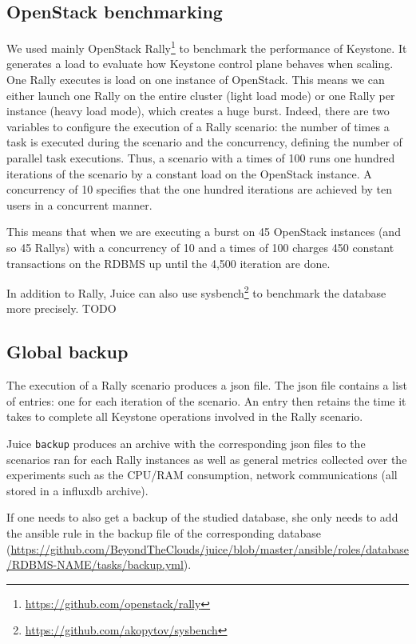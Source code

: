 \subsection{OpenStack benchmarking}
\label{subsec:benchmarking}

We used mainly OpenStack Rally\footnote{\url{https://github.com/openstack/rally}} to benchmark the performance of Keystone. It generates a load to evaluate how Keystone control plane behaves when scaling.
One Rally executes is load on one instance of OpenStack. This means we can either launch one Rally on the entire cluster (light load mode) or one Rally per instance (heavy load mode), which creates a huge burst. Indeed, there are two variables to configure the execution of a Rally scenario: the number of times a task is executed during the scenario and the concurrency, defining the number of parallel task executions. Thus, a scenario with a times of 100 runs one hundred iterations of the scenario by a constant load on the OpenStack instance. A concurrency of 10 specifies that the one hundred iterations are achieved by ten users in a concurrent manner.

This means that when we are executing a burst on 45 OpenStack instances (and so 45 Rallys) with a concurrency of 10 and a times of 100 charges 450 constant transactions on the RDBMS up until the 4,500 iteration are done.

In addition to Rally, Juice can also use sysbench\footnote{\url{https://github.com/akopytov/sysbench}} to benchmark the database more precisely.
TODO


\subsection{Global backup}

The execution of a Rally scenario produces a json file. The json file contains a list of entries: one for each iteration of the scenario. An entry then retains the time it takes to complete all Keystone operations involved in the Rally scenario.

Juice \verb+backup+ produces an archive with the corresponding json files to the scenarios ran for each Rally instances as well as general metrics collected over the experiments such as the CPU/RAM consumption, network communications (all stored in a influxdb archive).

If one needs to also get a backup of the studied database, she only needs to add the ansible rule in the backup file of the corresponding database (\url{https://github.com/BeyondTheClouds/juice/blob/master/ansible/roles/database/RDBMS-NAME/tasks/backup.yml}).


